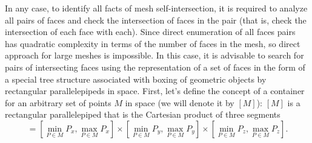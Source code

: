 \documentclass[
11pt,%
tightenlines,%
twoside,%
onecolumn,%
nofloats,%
nobibnotes,%
nofootinbib,%
superscriptaddress,%
noshowpacs,%
centertags]%
{revtex4-2}
\begin{document}
In any case, to identify all facts of mesh self-intersection, it is required to analyze all pairs of faces and check the intersection of faces in the pair (that is, check the intersection of each face with each).
Since direct enumeration of all faces pairs has quadratic complexity in terms of the number of faces in the mesh, so direct approach for large meshes is impossible.
In this case, it is advisable to search for pairs of intersecting faces using the representation of a set of faces in the form of a special tree structure associated with boxing of geometric objects by rectangular parallelepipeds in space.
First, let's define the concept of a container for an  arbitrary set
of points $M$ in space (we will denote it by $[M]$): $[M]$ is a
rectangular parallelepiped that is the Cartesian product of three
segments
\begin{equation}
[M] = \left[\min_{P \in M}{P_x}, \max_{P \in M}{P_x}\right]
      \times \left[\min_{P \in M}{P_y}, \max_{P \in M}{P_y}\right]
      \times \left[\min_{P \in M}{P_z}, \max_{P \in M}{P_z}\right].
\end{equation}
\end{document}
